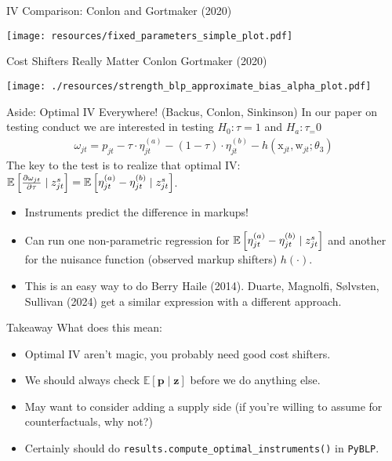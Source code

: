 \begin{frame}{IV Comparison: Conlon and Gortmaker (2020)}
\begin{center}
\texttt{[image: resources/fixed\_parameters\_simple\_plot.pdf]}
\end{center}
\end{frame}


\begin{frame}{Cost Shifters Really Matter Conlon Gortmaker (2020)}
\begin{center}
    \texttt{[image: ./resources/strength\_blp\_approximate\_bias\_alpha\_plot.pdf]}
\end{center}
\end{frame}

\begin{frame}{Aside: Optimal IV Everywhere! (Backus, Conlon, Sinkinson)}
In our paper on testing conduct we are interested in testing $H_0: \tau=1$ and $H_a: \tau_=0$
\begin{align*}
\omega_{jt} = p_{jt} -\tau \cdot \eta_{jt}^{(a)} - (1-\tau) \cdot \eta_{jt}^{(b)} - h(\textrm{x}_{jt},\textrm{w}_{jt}; \theta_3) 
\end{align*}
The key to the test is to realize that optimal IV: $\mathbb{E}\left[\frac{\partial \omega_{jt}}{\partial \tau} \mid z_{jt}^s \right] = \mathbb{E}\left[\eta_{jt}^{(a)} -\eta_{jt}^{(b)} \mid z_{jt}^s \right]$.
\begin{itemize}
    \item Instruments \alert{predict the difference in markups}!
    \item Can run one non-parametric regression for  $\mathbb{E}\left[\eta_{jt}^{(a)} -\eta_{jt}^{(b)} \mid z_{jt}^s \right]$ and another for the nuisance function (observed markup shifters) $h(\cdot)$.
    \item This is an easy way to do Berry Haile (2014). Duarte, Magnolfi, Sølvsten, Sullivan (2024) get a similar expression with a different approach.
\end{itemize}
\end{frame}


\begin{frame}{Takeaway}
What does this mean:
\begin{itemize}
    \item Optimal IV aren't magic, you probably need good cost shifters.
    \item We should always check $\mathbb{E}[\symbf{p} \mid \symbf{z}]$ before we do anything else.
    \item May want to consider adding a supply side (if you're willing to assume for counterfactuals, why not?)
    \item Certainly should do \texttt{results.compute\_optimal\_instruments()} in \texttt{PyBLP}.
\end{itemize}
\end{frame}


